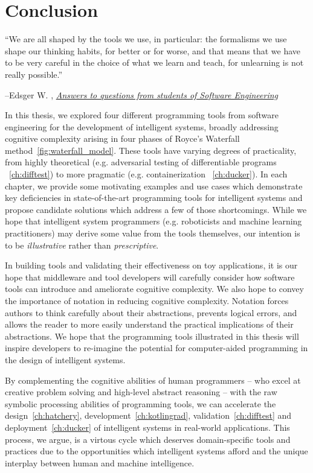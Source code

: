 \chapter{Conclusion}\label{ch:conclusion}
\setlength{\epigraphwidth}{0.90\textwidth}
\epigraph{``We are all shaped by the tools we use, in particular: the formalisms we use shape our thinking habits, for better or for worse, and that means that we have to be very careful in the choice of what we learn and teach, for unlearning is not really possible.''}{\begin{flushright}--Edsger W. \citet{dijkstra2000answers}, \href{https://www.cs.utexas.edu/~EWD/transcriptions/EWD13xx/EWD1305.html}{\textit{Answers to questions from students of Software Engineering}}\end{flushright}}

In this thesis, we explored four different programming tools from software engineering for the development of intelligent systems, broadly addressing cognitive complexity arising in four phases of Royce's Waterfall method~\autoref{fig:waterfall_model}. These tools have varying degrees of practicality, from highly theoretical (e.g. adversarial testing of differentiable programs ~\autoref{ch:difftest}) to more pragmatic (e.g. containerization ~\autoref{ch:ducker}). In each chapter, we provide some motivating examples and use cases which demonstrate key deficiencies in state-of-the-art programming tools for intelligent systems and propose candidate solutions which address a few of those shortcomings. While we hope that intelligent system programmers (e.g. roboticists and machine learning practitioners) may derive some value from the tools themselves, our intention is to be \textit{illustrative} rather than \textit{prescriptive}.

In building tools and validating their effectiveness on toy applications, it is our hope that middleware and tool developers will carefully consider how software tools can introduce and ameliorate cognitive complexity. We also hope to convey the importance of notation in reducing cognitive complexity. Notation forces authors to think carefully about their abstractions, prevents logical errors, and allows the reader to more easily understand the practical implications of their abstractions. We hope that the programming tools illustrated in this thesis will inspire developers to re-imagine the potential for computer-aided programming in the design of intelligent systems.

By complementing the cognitive abilities of human programmers -- who excel at creative problem solving and high-level abstract reasoning -- with the raw symbolic processing abilities of programming tools, we can accelerate the design~\autoref{ch:hatchery}, development~\autoref{ch:kotlingrad}, validation~\autoref{ch:difftest} and deployment~\autoref{ch:ducker} of intelligent systems in real-world applications. This process, we argue, is a virtous cycle which deserves domain-specific tools and practices due to the opportunities which intelligent systems afford and the unique interplay between human and machine intelligence.

